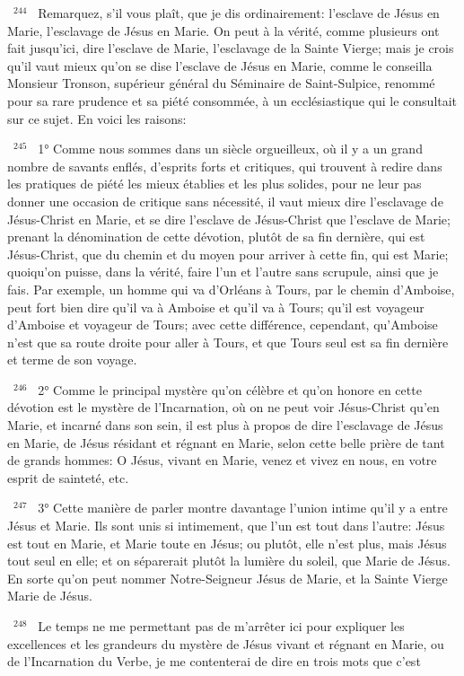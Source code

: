 \documentclass[paper=a5,pagesize=pdftex,fontsize=15pt,headinclude=on,twoside=off]{scrbook}
\newcommand{\negphantom}[1]{\settowidth{\dimen0}{#1}\hspace*{-\dimen0}}
\newcommand{\versenb}[1]{\par \vspace{10pt}~\negphantom{~${}^{#1}$~}${}^{#1}$~}
\begin{document}
\versenb{244} Remarquez, s'il vous plaît, que je dis ordinairement: l'esclave de Jésus en Marie, l'esclavage de Jésus en
Marie. On peut à la vérité, comme plusieurs ont fait jusqu'ici, dire l'esclave de Marie, l'esclavage de la Sainte
Vierge; mais je crois qu'il vaut mieux qu'on se dise l'esclave de Jésus en Marie, comme le conseilla Monsieur
Tronson, supérieur général du Séminaire de Saint-Sulpice, renommé pour sa rare prudence et sa piété
consommée, à un ecclésiastique qui le consultait sur ce sujet. En voici les raisons:
\versenb{245} 1° Comme nous sommes dans un siècle orgueilleux, où il y a un grand nombre de savants enflés, d'esprits
forts et critiques, qui trouvent à redire dans les pratiques de piété les mieux établies et les plus solides, pour ne
leur pas donner une occasion de critique sans nécessité, il vaut mieux dire l'esclavage de Jésus-Christ en Marie,
et se dire l'esclave de Jésus-Christ que l'esclave de Marie; prenant la dénomination de cette dévotion, plutôt de sa
fin dernière, qui est Jésus-Christ, que du chemin et du moyen pour arriver à cette fin, qui est Marie; quoiqu'on
puisse, dans la vérité, faire l'un et l'autre sans scrupule, ainsi que je fais. Par exemple, un homme qui va d'Orléans
à Tours, par le chemin d'Amboise, peut fort bien dire qu'il va à Amboise et qu'il va à Tours; qu'il est voyageur
d'Amboise et voyageur de Tours; avec cette différence, cependant, qu'Amboise n'est que sa route droite pour aller
à Tours, et que Tours seul est sa fin dernière et terme de son voyage.
\versenb{246} 2° Comme le principal mystère qu'on célèbre et qu'on honore en cette dévotion est le mystère de
l'Incarnation, où on ne peut voir Jésus-Christ qu'en Marie, et incarné dans son sein, il est plus à propos de dire
l'esclavage de Jésus en Marie, de Jésus résidant et régnant en Marie, selon cette belle prière de tant de grands
hommes: O Jésus, vivant en Marie, venez et vivez en nous, en votre esprit de sainteté, etc.
\versenb{247} 3° Cette manière de parler montre davantage l'union intime qu'il y a entre Jésus et Marie. Ils sont unis si
intimement, que l'un est tout dans l'autre: Jésus est tout en Marie, et Marie toute en Jésus; ou plutôt, elle n'est
plus, mais Jésus tout seul en elle; et on séparerait plutôt la lumière du soleil, que Marie de Jésus. En sorte qu'on
peut nommer Notre-Seigneur Jésus de Marie, et la Sainte Vierge Marie de Jésus.
\versenb{248} Le temps ne me permettant pas de m'arrêter ici pour expliquer les excellences et les grandeurs du mystère
de Jésus vivant et régnant en Marie, ou de l'Incarnation du Verbe, je me contenterai de dire en trois mots que c'est
\end{document}
